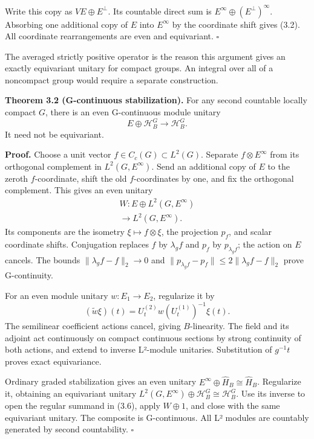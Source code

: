 \documentclass[
  11pt,
]{article}
\begin{document}
Write this copy as \(VE\oplus E^\perp\). Its countable direct sum is
\(E^\infty\oplus(E^\perp)^\infty\). Absorbing one additional copy of
\(E\) into \(E^\infty\) by the coordinate shift gives (3.2). All
coordinate rearrangements are even and equivariant. \(\square\)

The averaged strictly positive operator is the reason this argument
gives an exactly equivariant unitary for compact groups. An integral
over all of a noncompact group would require a separate construction.

\textbf{Theorem 3.2 (G-continuous stabilization).} For any second
countable locally compact \(G\), there is an even G-continuous module
unitary \[
E\oplus\mathcal H_B^G\longrightarrow\mathcal H_B^G.
\tag{3.6}
\] It need not be equivariant.

\textbf{Proof.} Choose a unit vector \(f\in C_c(G)\subset L^2(G)\).
Separate \(f\otimes E^\infty\) from its orthogonal complement in
\(L^2(G,E^\infty)\). Send an additional copy of \(E\) to the zeroth
\(f\)-coordinate, shift the old \(f\)-coordinates by one, and fix the
orthogonal complement. This gives an even unitary \[
\begin{gathered}
W:E\oplus L^2(G,E^\infty)\\
\longrightarrow L^2(G,E^\infty).
\end{gathered}
\tag{3.7}
\] Its components are the isometry \(\xi\mapsto f\otimes\xi\), the
projection \(p_f\), and scalar coordinate shifts. Conjugation replaces
\(f\) by \(\lambda_gf\) and \(p_f\) by \(p_{\lambda_gf}\); the action on
\(E\) cancels. The bounds \(\|\lambda_gf-f\|_2\to0\) and
\(\|p_{\lambda_gf}-p_f\|\leq2\|\lambda_gf-f\|_2\) prove G-continuity.

For an even module unitary \(w:E_1\to E_2\), regularize it by \[
(\widetilde w\xi)(t)=
 U_t^{(2)}w(U_t^{(1)})^{-1}\xi(t).
\tag{3.8}
\] The semilinear coefficient actions cancel, giving \(B\)-linearity.
The field and its adjoint act continuously on compact continuous
sections by strong continuity of both actions, and extend to inverse
L²-module unitaries. Substitution of \(g^{-1}t\) proves exact
equivariance.

Ordinary graded stabilization gives an even unitary
\(E^\infty\oplus\widehat H_B\cong\widehat H_B\). Regularize it,
obtaining an equivariant unitary
\(L^2(G,E^\infty)\oplus\mathcal H_B^G\cong\mathcal H_B^G\). Use its
inverse to open the regular summand in (3.6), apply \(W\oplus1\), and
close with the same equivariant unitary. The composite is G-continuous.
All L² modules are countably generated by second countability.
\(\square\)
\end{document}
